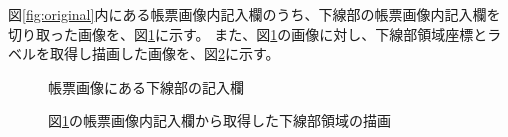 図\ref{fig:original}内にある帳票画像内記入欄のうち、下線部の帳票画像内記入欄を切り取った画像を、図\ref{fig:underline_original}に示す。
また、図\ref{fig:underline_original}の画像に対し、下線部領域座標とラベルを取得し描画した画像を、図\ref{fig:underline_drawing}に示す。
\begin{figure}[t]
    \begin{center}
        \caption{帳票画像にある下線部の記入欄}
        \label{fig:underline_original}
    \end{center}
\end{figure}
\begin{figure}[t]
    \begin{center}
        \caption{図\ref{fig:underline_original}の帳票画像内記入欄から取得した下線部領域の描画}
        \label{fig:underline_drawing}
    \end{center}
\end{figure}
